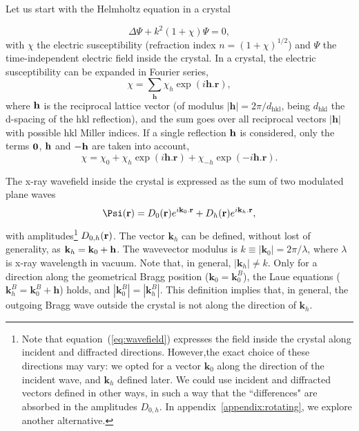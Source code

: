 \documentclass[preprint]{iucr}              %
\begin{document}
Let us start with the Helmholtz equation in a crystal

\begin{equation}
\label{eq:helmholz}
    \Delta \Psi + k^2 (1+\chi) \Psi = 0,
\end{equation}
with $\chi$ the electric susceptibility (refraction index $n=(1+\chi)^{1/2}$) and $\Psi$ the time-independent electric field inside the crystal. In a crystal, the electric susceptibility can be expanded in Fourier series,
\begin{equation}
\label{eq:chi}
    \chi = \sum_{\textbf{h}} \chi_h \exp(i \textbf{h} . \textbf{r}),
\end{equation}
where $\bf{h}$ is the reciprocal lattice vector (of modulus $|\textbf{h}|=2\pi/d_\text{hkl}$, being $d_\text{hkl}$ the d-spacing of the hkl reflection), and the sum goes over all reciprocal vectors $|\textbf{h}|$ with possible hkl Miller indices. If a single reflection $\bf{h}$ is considered, only the terms $\bf{0}$, $\bf{h}$ and $\bf{-h}$ are taken into account, 
\begin{equation}
\label{eq:chisimple}
    \chi = \chi_0 + \chi_{h} \exp(i \textbf{h} . \textbf{r}) + \chi_{-h} \exp(-i \textbf{h} . \textbf{r}).
\end{equation}

The x-ray wavefield inside the crystal is expressed as the sum of two modulated plane waves
\begin{equation}
\label{eq:wavefield}
    \Psi(\textbf r) = D_0(\textbf r) e^{i \textbf k_0 . \textbf r} + D_h(\textbf r) e^{i \textbf k_h . \textbf r},
\end{equation}
with amplitudes\footnote{
Note that equation~(\ref{eq:wavefield}) expresses the field inside the crystal along incident and diffracted directions. However,the exact choice of  these directions may vary: we opted for a vector $\textbf{k}_0$ along the direction of the incident wave, and $\textbf{k}_h$ defined later. We could use incident and diffracted vectors defined in other ways, in such a way that the ``differences" are absorbed in the amplitudes $D_{0,h}$. In appendix~\ref{appendix:rotating}, we explore another alternative.
} $D_{0,h}(\textbf r)$.
The vector $\textbf{k}_h$ can be defined, without lost of generality, as $\textbf k_h=\textbf k_0 + \textbf h$. 
The wavevector modulus is $k \equiv |\textbf{k}_0|=2\pi/\lambda$, where $\lambda$ is x-ray wavelength in vacuum. Note that, in general, $ |\textbf{k}_h| \ne k$. Only for a direction along the geometrical Bragg position ($\textbf{k}_0=\textbf{k}_0^B$), the Laue equations ($\textbf{k}_h^B=\textbf{k}_0^B+\textbf{h}$) holds, and $|\textbf{k}_0^B|=|\textbf{k}_h^B|$. This definition implies that, in general, the outgoing Bragg wave outside the crystal is not along the direction of $\textbf{k}_h$.
\end{document}
